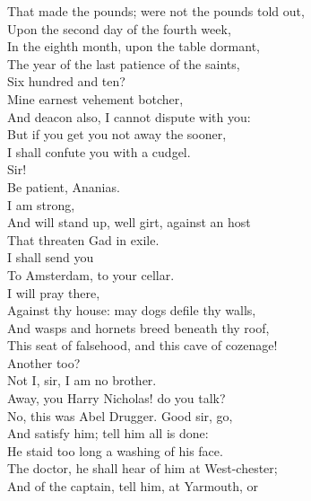 \documentclass[a4paper,oneside]{memoir}
\begin{document}
\begin{drama*}
That made the pounds; were not the pounds told out,\\
Upon the second day of the fourth week,\\
In the eighth month, upon the table dormant,\\
The year of the last patience of the saints,\\
Six hundred and ten?\\
\lovewitspeaks {} Mine earnest vehement botcher,\\
And deacon also, I cannot dispute with you:\\
But if you get you not away the sooner,\\
I shall confute you with a cudgel.\\
\ananiasspeaks Sir!\\
\tribulationspeaks {} Be patient, Ananias.\\
\ananiasspeaks {} I am strong,\\
And will stand up, well girt, against an host\\
That threaten Gad in exile.\\
\lovewitspeaks {} I shall send you\\
To Amsterdam, to your cellar.\\
\ananiasspeaks {} I will pray there,\\
Against thy house: may dogs defile thy walls,\\
And wasps and hornets breed beneath thy roof,\\
This seat of falsehood, and this cave of cozenage!\\
\lovewitspeaks Another too?\\
\druggerspeaks {} Not I, sir, I am no brother.\\
\lovewitspeaks {} Away, you Harry Nicholas! do you talk?\\
\facespeaks No, this was Abel Drugger. Good sir, go,\\
And satisfy him; tell him all is done:\\
He staid too long a washing of his face.\\
The doctor, he shall hear of him at West-chester;\\
And of the captain, tell him, at Yarmouth, or\\

\end{drama*}
\end{document}
